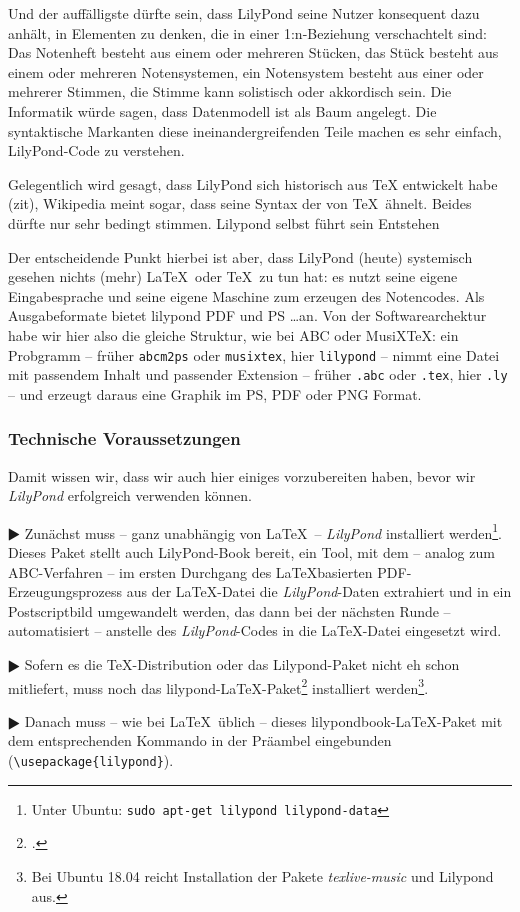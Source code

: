 Und der auffälligste dürfte sein, dass LilyPond seine Nutzer konsequent dazu
anhält, in Elementen zu denken, die in einer 1:n-Beziehung verschachtelt sind:
Das Notenheft besteht aus einem oder mehreren Stücken, das Stück besteht aus
einem oder mehreren Notensystemen, ein Notensystem besteht aus einer oder
mehrerer Stimmen, die Stimme kann solistisch oder akkordisch sein. Die
Informatik würde sagen, dass Datenmodell ist als Baum angelegt. Die syntaktische
Markanten diese ineinandergreifenden Teile machen es sehr einfach, LilyPond-Code
zu verstehen.

Gelegentlich wird gesagt, dass LilyPond sich historisch aus TeX entwickelt habe
(zit), Wikipedia meint sogar, dass seine Syntax der von \TeX\ ähnelt. Beides
dürfte nur sehr bedingt stimmen. Lilypond selbst führt sein Entstehen

Der entscheidende Punkt hierbei ist aber, dass LilyPond (heute) systemisch
gesehen nichts (mehr) \LaTeX\ oder \TeX\  zu tun hat: es nutzt seine eigene
Eingabesprache und seine eigene Maschine zum erzeugen des Notencodes. Als
Ausgabeformate bietet lilypond PDF und PS \ldots an. Von der Softwarearchektur
habe wir hier also die gleiche Struktur, wie bei ABC oder MusiX\TeX: ein
Probgramm -- früher \texttt{abcm2ps} oder \texttt{musixtex}, hier
\texttt{lilypond} -- nimmt eine Datei mit passendem Inhalt und passender
Extension -- früher \texttt{.abc} oder \texttt{.tex}, hier
\texttt{.ly} -- und erzeugt daraus eine Graphik im PS, PDF oder PNG Format.

\subsubsection{Technische Voraussetzungen}

Damit wissen wir, dass wir auch hier einiges vorzubereiten haben, bevor wir
\emph{LilyPond} erfolgreich verwenden können.

$\RHD$ Zunächst muss -- ganz unabhängig von \LaTeX\ -- \emph{LilyPond}
installiert werden\footnote{Unter Ubuntu: \texttt{sudo apt-get lilypond
lilypond-data}}. Dieses Paket stellt auch LilyPond-Book bereit, ein Tool, mit
dem -- analog zum ABC-Verfahren -- im  ersten Durchgang des \LaTeX basierten
PDF-Erzeugungsprozess aus der \LaTeX-Datei die \emph{LilyPond}-Daten extrahiert
und in ein Postscriptbild umgewandelt werden, das dann bei der nächsten Runde --
automatisiert -- anstelle des \emph{LilyPond}-Codes in die \LaTeX-Datei
eingesetzt wird.
  
$\RHD$ Sofern es die \TeX-Distribution oder das Lilypond-Paket nicht eh schon
mitliefert, muss noch das lilypond-\LaTeX-Paket\footcite[vgl.][\nopage
wp]{CtanAbc2018a} installiert werden\footnote{Bei Ubuntu 18.04 reicht
Installation der Pakete \emph{texlive-music} und Lilypond aus.}.
  
$\RHD$ Danach muss -- wie bei \LaTeX\ üblich -- dieses
lilypondbook-\LaTeX-Paket  mit dem entsprechenden Kommando in der Präambel
eingebunden (\texttt{\textbackslash{usepackage}\{lilypond\}}).


%
